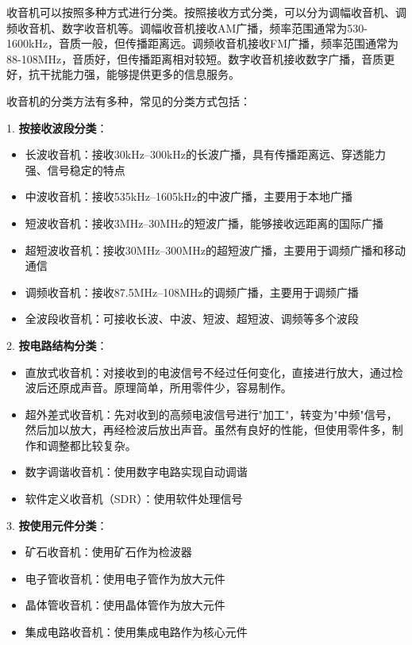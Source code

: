 \documentclass[12pt,UTF8]{ctexbook}
\begin{document}
收音机可以按照多种方式进行分类。按照接收方式分类，可以分为调幅收音机、调频收音机、数字收音机等。调幅收音机接收AM广播，频率范围通常为530-1600kHz，音质一般，但传播距离远。调频收音机接收FM广播，频率范围通常为88-108MHz，音质好，但传播距离相对较短。数字收音机接收数字广播，音质更好，抗干扰能力强，能够提供更多的信息服务。

收音机的分类方法有多种，常见的分类方式包括：

1. \textbf{按接收波段分类}：
   \begin{itemize}[leftmargin=3.5em]
   \item 长波收音机：接收30kHz--300kHz的长波广播，具有传播距离远、穿透能力强、信号稳定的特点
   \item 中波收音机：接收535kHz--1605kHz的中波广播，主要用于本地广播
   \item 短波收音机：接收3MHz--30MHz的短波广播，能够接收远距离的国际广播
   \item 超短波收音机：接收30MHz--300MHz的超短波广播，主要用于调频广播和移动通信
   \item 调频收音机：接收87.5MHz--108MHz的调频广播，主要用于调频广播
   \item 全波段收音机：可接收长波、中波、短波、超短波、调频等多个波段
   \end{itemize}

2. \textbf{按电路结构分类}：
   \begin{itemize}[leftmargin=3.5em]
   \item 直放式收音机：对接收到的电波信号不经过任何变化，直接进行放大，通过检波后还原成声音。原理简单，所用零件少，容易制作。
   \item 超外差式收音机：先对收到的高频电波信号进行"加工"，转变为"中频"信号，然后加以放大，再经检波后放出声音。虽然有良好的性能，但使用零件多，制作和调整都比较复杂。
   \item 数字调谐收音机：使用数字电路实现自动调谐
   \item 软件定义收音机（SDR）：使用软件处理信号
   \end{itemize}

3. \textbf{按使用元件分类}：
   \begin{itemize}[leftmargin=3.5em]
   \item 矿石收音机：使用矿石作为检波器
   \item 电子管收音机：使用电子管作为放大元件
   \item 晶体管收音机：使用晶体管作为放大元件
   \item 集成电路收音机：使用集成电路作为核心元件
   \end{itemize}
\end{document}
